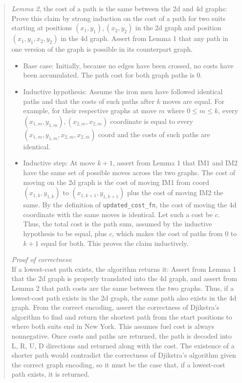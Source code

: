 \documentclass[11pt]{article}
\begin{document}
\begin{enumerate}
\begin{enumerate}
\begin{quote}
  \medskip
  \textit{Lemma 2}, the cost of a path is the same between the 2d and 4d graphs: Prove this claim by strong induction on the cost of a path for two suits starting at positions $(x_1, y_1), (x_2, y_2)$ in the 2d graph and position $(x_1, y_1, x_2, y_2)$ in the 4d graph. Assert from Lemma 1 that any path in one version of the graph is possible in its counterpart graph.
  \begin{itemize}
    \item Base case: Initially, because no edges have been crossed, no costs have been accumulated. The path cost for both graph paths is 0.
    \item Inductive hypothesis: Assume the iron men have followed identical paths and that the costs of such paths after $k$ moves are equal. For example, for their respective graphs at move $m$ where $0 \leq m \leq k$, every $(x_{1, m}, y_{1, m}), (x_{2, m}, x_{2, m})$ coordinate is equal to every $(x_{1, m}, y_{1, m}, x_{2, m}, x_{2, m})$ coord and the costs of such paths are identical.
    \item Inductive step: At move $k + 1$, assert from Lemma 1 that IM1 and IM2 have the same set of possible moves across the two graphs. The cost of moving on the 2d graph is the cost of moving IM1 from coord $(x_{1, k}, y_{1, k})$ to $(x_{1, k + 1}, y_{1, k + 1})$ plus the cost of moving IM2 the same. By the definition of \texttt{updated\_cost\_fn}, the cost of moving the 4d coordinate with the same moves is identical. Let such a cost be $c$. Thus, the total cost is the path sum, assumed by the inductive hypothesis to be equal, plus $c$, which makes the cost of paths from 0 to $k + 1$ equal for both. This proves the claim inductively. 
  \end{itemize}

\medskip
\textit{Proof of correctness}: \\ 
If a lowest-cost path exists, the algorithm returns it: Assert from Lemma 1 that the 2d graph is properly translated into the 4d graph, and assert from Lemma 2 that path costs are the same between the two graphs. Thus, if a lowest-cost path exists in the 2d graph, the same path also exists in the 4d graph. From the correct encoding, assert the correctness of Djikstra's algorithm to find and return the shortest path from the start positions to where both suits end in New York. This assumes fuel cost is always nonnegative. Once costs and paths are returned, the path is decoded into {L, R, U, D} directions and returned along with the cost. The existence of a shorter path would contradict the correctness of Djikstra's algorithm given the correct graph encoding, so it must be the case that, if a lowest-cost path exists, it is returned.


\end{quote}
\end{enumerate}
\end{enumerate}
\end{document}
